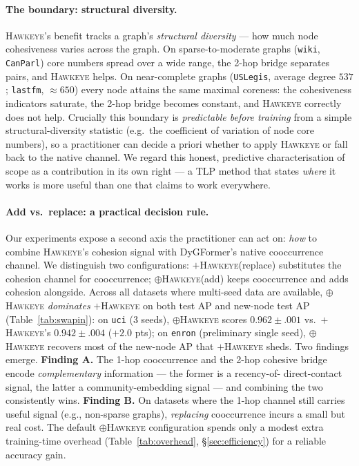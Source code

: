 \documentclass[sigconf,nonacm,review]{acmart}
\newcommand{\method}{\textsc{Hawkeye}\xspace}
\newcommand{\eg}{e.g.,\xspace}
\begin{document}
\paragraph{The boundary: structural diversity.}
\method's benefit tracks a graph's \emph{structural diversity} --- how much
node cohesiveness varies across the graph. On sparse-to-moderate graphs
(\texttt{wiki}, \texttt{CanParl}) core numbers spread over a wide range, the
2-hop bridge separates pairs, and \method helps. On near-complete graphs
(\texttt{USLegis}, average degree $537$; \texttt{lastfm}, $\approx650$) every
node attains the same maximal coreness: the cohesiveness indicators saturate,
the 2-hop bridge becomes constant, and \method correctly does not help.
Crucially this boundary is \emph{predictable before training} from a simple
structural-diversity statistic (e.g.\ the coefficient of variation of node core
numbers), so a practitioner can decide a priori whether to apply \method or
fall back to the native channel. We regard this honest, predictive
characterisation of scope as a contribution in its own right --- a TLP method
that states \emph{where} it works is more useful than one that claims to work
everywhere.

\paragraph{Add vs.\ replace: a practical decision rule.}
\label{sec:decisionrule}
Our experiments expose a second axis the practitioner can act on:
\emph{how} to combine \method's cohesion signal with DyGFormer's native
cooccurrence channel. We distinguish two configurations:
$+$\method (replace) substitutes the cohesion channel for cooccurrence;
$\oplus$\method (add) keeps cooccurrence and adds cohesion alongside.
Across all datasets where multi-seed data are available, $\oplus$\method
\emph{dominates} $+$\method on both test AP and new-node test AP
(Table~\ref{tab:swapin}):
on \texttt{uci} (3 seeds), $\oplus$\method scores $0.962\!\pm\!.001$ vs.\
$+$\method's $0.942\!\pm\!.004$ ($+2.0$ pts);
on \texttt{enron} (preliminary single seed), $\oplus$\method recovers most
of the new-node AP that $+$\method sheds. Two findings emerge.
\textbf{Finding A.} The 1-hop cooccurrence and the 2-hop cohesive bridge
encode \emph{complementary} information --- the former is a recency-of-
direct-contact signal, the latter a community-embedding signal --- and
combining the two consistently wins.
\textbf{Finding B.} On datasets where the 1-hop channel still carries
useful signal (\eg{} non-sparse graphs), \emph{replacing} cooccurrence
incurs a small but real cost. The default $\oplus$\method configuration
spends only a modest extra training-time overhead (Table~\ref{tab:overhead},
\S\ref{sec:efficiency}) for a reliable accuracy gain.
\end{document}
